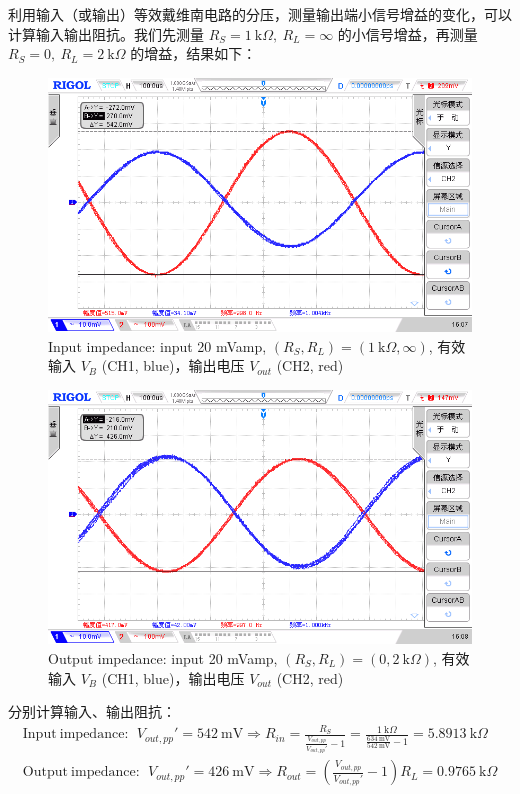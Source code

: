 \documentclass[UTF8]{article}
\begin{document}
利用输入（或输出）等效戴维南电路的分压，测量输出端小信号增益的变化，可以计算输入输出阻抗。我们先测量 $R_S = 1\ \mathrm{k}\Omega,\ R_L = \infty$ 的小信号增益，再测量 $R_S = 0,\ R_L = 2\ \mathrm{k}\Omega$ 的增益，结果如下：
\begin{figure}[H]\centering
    \includegraphics[width=\columnwidth]{LCE-02-三极管/assets/输入阻抗 R_S = 1k.png}
    \caption{Input impedance: input 20 mVamp, $(R_S, R_L) = (1 \ \mathrm{k}\Omega, \infty)$, 有效输入 $V_{B}$ (CH1, blue)，输出电压 $V_{out}$ (CH2, red)}
    \label{fig: Input impedance}
\end{figure}
\begin{figure}[H]\centering
    \includegraphics[width=\columnwidth]{LCE-02-三极管/assets/输出阻抗 R_L = 2k.png}
    \caption{Output impedance: input 20 mVamp, $(R_S, R_L) = (0, 2 \ \mathrm{k}\Omega)$, 有效输入 $V_{B}$ (CH1, blue)，输出电压 $V_{out}$ (CH2, red)}
    \label{fig: Output impedance}
\end{figure}

分别计算输入、输出阻抗：
\begin{gather}
\mathrm{Input\ impedance: \ \ } V_{out,pp}' = 542 \ \mathrm{mV}
\Longrightarrow 
R_{in} = \frac{R_S}{\frac{V_{out,pp}}{V_{out,pp}'} - 1} 
= \frac{1 \ \mathrm{k}\Omega}{\frac{634 \ \mathrm{mV}}{542 \ \mathrm{mV}} - 1}
= 5.8913 \ \mathrm{k}\Omega
\\ 
\mathrm{Output\ impedance: \ \ } V_{out,pp}' = 426 \ \mathrm{mV}
\Longrightarrow 
R_{out} = \left(\frac{V_{out,pp}}{V_{out,pp}'} - 1\right) R_L 
= 0.9765 \ \mathrm{k}\Omega
\end{gather}
\end{document}
